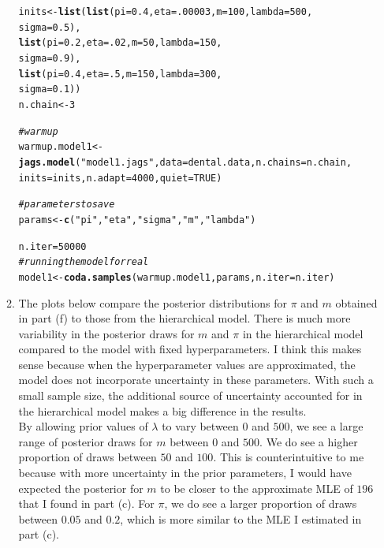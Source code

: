 \documentclass[12pt]{article}\usepackage[]{graphicx}\usepackage[]{color}
\makeatletter
\newcommand{\hlnum}[1]{\textcolor[rgb]{0.686,0.059,0.569}{#1}}%
\newcommand{\hlstr}[1]{\textcolor[rgb]{0.192,0.494,0.8}{#1}}%
\newcommand{\hlcom}[1]{\textcolor[rgb]{0.678,0.584,0.686}{\textit{#1}}}%
\newcommand{\hlstd}[1]{\textcolor[rgb]{0.345,0.345,0.345}{#1}}%
\newcommand{\hlkwb}[1]{\textcolor[rgb]{0.69,0.353,0.396}{#1}}%
\newcommand{\hlkwc}[1]{\textcolor[rgb]{0.333,0.667,0.333}{#1}}%
\newcommand{\hlkwd}[1]{\textcolor[rgb]{0.737,0.353,0.396}{\textbf{#1}}}%
\newenvironment{kframe}{%
 \def\at@end@of@kframe{}%
 \ifinner\ifhmode%
  \def\at@end@of@kframe{\end{minipage}}%
  \begin{minipage}{\columnwidth}%
 \fi\fi%
 \def\FrameCommand##1{\hskip\@totalleftmargin \hskip-\fboxsep
 \colorbox{shadecolor}{##1}\hskip-\fboxsep
     \hskip-\linewidth \hskip-\@totalleftmargin \hskip\columnwidth}%
 \MakeFramed {\advance\hsize-\width
   \@totalleftmargin\z@ \linewidth\hsize
   \@setminipage}}%
 {\par\unskip\endMakeFramed%
 \at@end@of@kframe}
\newenvironment{knitrout}{}{} %
\makeatother
\begin{document}
\begin{enumerate}
\begin{enumerate}
\begin{knitrout}
\begin{kframe}
\begin{alltt}
\hlstd{inits} \hlkwb{<-} \hlkwd{list}\hlstd{(}\hlkwd{list}\hlstd{(}\hlkwc{pi}\hlstd{=}\hlnum{0.4}\hlstd{,} \hlkwc{eta} \hlstd{=} \hlnum{.00003}\hlstd{,} \hlkwc{m} \hlstd{=} \hlnum{100}\hlstd{,} \hlkwc{lambda} \hlstd{=} \hlnum{500}\hlstd{,}
                   \hlkwc{sigma} \hlstd{=} \hlnum{0.5}\hlstd{),}
              \hlkwd{list}\hlstd{(}\hlkwc{pi}\hlstd{=}\hlnum{0.2}\hlstd{,} \hlkwc{eta} \hlstd{=} \hlnum{.02}\hlstd{,} \hlkwc{m} \hlstd{=} \hlnum{50}\hlstd{,} \hlkwc{lambda} \hlstd{=} \hlnum{150}\hlstd{,}
                   \hlkwc{sigma} \hlstd{=} \hlnum{0.9}\hlstd{),}
              \hlkwd{list}\hlstd{(}\hlkwc{pi}\hlstd{=}\hlnum{0.4}\hlstd{,} \hlkwc{eta} \hlstd{=} \hlnum{.5}\hlstd{,} \hlkwc{m} \hlstd{=} \hlnum{150}\hlstd{,} \hlkwc{lambda} \hlstd{=} \hlnum{300}\hlstd{,}
                   \hlkwc{sigma} \hlstd{=} \hlnum{0.1}\hlstd{))}
\hlstd{n.chain} \hlkwb{<-} \hlnum{3}

\hlcom{#warmup}
\hlstd{warmup.model1} \hlkwb{<-} \hlkwd{jags.model}\hlstd{(}\hlstr{"model1.jags"}\hlstd{,} \hlkwc{data}\hlstd{=dental.data,} \hlkwc{n.chains}\hlstd{=n.chain,}
                            \hlkwc{inits}\hlstd{= inits,} \hlkwc{n.adapt}\hlstd{=}\hlnum{4000}\hlstd{,} \hlkwc{quiet}\hlstd{=}\hlnum{TRUE}\hlstd{)}

\hlcom{#parameters to save}
\hlstd{params} \hlkwb{<-} \hlkwd{c}\hlstd{(}\hlstr{"pi"}\hlstd{,} \hlstr{"eta"}\hlstd{,} \hlstr{"sigma"}\hlstd{,} \hlstr{"m"}\hlstd{,} \hlstr{"lambda"}\hlstd{)}

\hlstd{n.iter}\hlkwb{=}\hlnum{50000}
\hlcom{#running the model for real}
\hlstd{model1} \hlkwb{<-} \hlkwd{coda.samples}\hlstd{(warmup.model1, params,} \hlkwc{n.iter}\hlstd{=n.iter)}
\end{alltt}
\end{kframe}
\end{knitrout}

\item The plots below compare the posterior distributions for $\pi$ and $m$ obtained in part (f) to those from the hierarchical model. There is much more variability in the posterior draws for $m$ and $\pi$ in the hierarchical model compared to the model with fixed hyperparameters. I think this makes sense because when the hyperparameter values are approximated, the model does not incorporate uncertainty in these parameters. With such a small sample size, the additional source of uncertainty accounted for in the hierarchical model makes a big difference in the results. \\

By allowing prior values of $\lambda$ to vary between $0$ and $500$, we see a large range of posterior draws for $m$ between $0$ and $500$. We do see a higher proportion of draws between $50$ and $100$. This is counterintuitive to me because with more uncertainty in the prior parameters, I would have expected the posterior for $m$ to be closer to the approximate MLE of $196$ that I found in part (c). For $\pi$, we do see a larger proportion of draws between $0.05$ and $0.2$, which is more similar to the MLE I estimated in part (c). 


\end{enumerate}
\end{enumerate}
\end{document}
